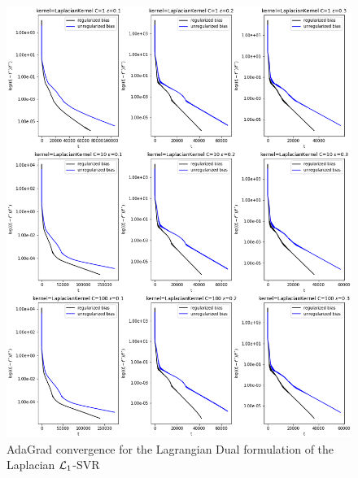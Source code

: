\begin{figure}[H]
	\centering
	\includegraphics[scale=0.55]{img/laplacian_lagrangian_dual_l1_svr_loss_history}
	\caption{AdaGrad convergence for the Lagrangian Dual formulation of the Laplacian $\protect \mathcal{L}_1$-SVR}
	\label{fig:laplacian_lagrangian_dual_l1_svr_loss_history}
\end{figure}

